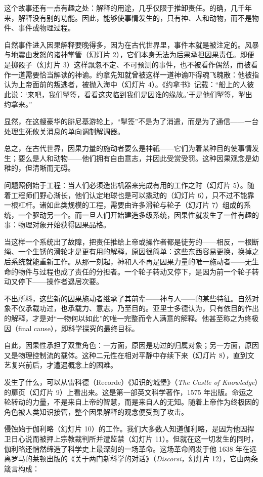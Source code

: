这个故事还有一点有趣之处：解释的用途，几乎仅限于推卸责任。的确，几千年来，解释没有别的功能。因此，能够使事情发生的，只有神、人和动物，而不是物件、事件或物理过程。

自然事件进入因果解释要晚得多，因为在古代世界里，事件本就是被注定的。风暴与地震由发怒的诸神掌管（幻灯片 2），它们本身无法为后果承担因果责任。即便是掷骰子（幻灯片 3）这样飘忽不定、不可预测的事件，也不被看作偶然，而被看作一道需要恰当解读的神谕。约拿先知就曾被这样一道神谕吓得魂飞魄散：他被指认为上帝面前的叛逃者，被抛入海中（幻灯片 4）。《约拿书》记载：“船上的人彼此说：‘来吧，我们掣签，看看这灾临到我们是因谁的缘故。’于是他们掣签，掣出约拿来。”

显然，在这艘豪华的腓尼基游轮上，“掣签”不是为了消遣，而是为了通信——一台处理生死攸关消息的单向调制解调器。

总之，在古代世界，因果力量的施动者要么是神祇——它们为着某种目的使事情发生；要么是人和动物——他们拥有自由意志，并因此受赏受罚。这种因果观念是幼稚的，但清晰而无碍。

问题照例始于工程：当人们必须造出机器来完成有用的工作之时（幻灯片 5）。随着工程师们野心渐长，他们认定地球也是可以撬动的（幻灯片 6），只不过不能靠一根杠杆。诸如此类规模的工程，需要由许多滑轮与轮子（幻灯片 7）组成的系统，一个驱动另一个。而一旦人们开始建造多级系统，因果性就发生了一件有趣的事：物理对象开始获得因果品格。

当这样一个系统出了故障，把责任推给上帝或操作者都是徒劳的——相反，一根断绳、一个生锈的滑轮才是更有用的解释，原因很简单：这些东西容易更换，换掉之后系统就能重新工作。从那一刻起，神和人不再是因果力量的唯一施动者——无生命的物件与过程也成了责任的分担者。一个轮子转动又停下，是因为前一个轮子转动又停下——操作者退居次要。

不出所料，这些新的因果施动者继承了其前辈——神与人——的某些特征。自然对象不仅承载功过，也承载力、意志，乃至目的。亚里士多德认为，只有依目的作出的解释，才是对“一物何以如此”的唯一完整而令人满意的解释。他甚至称之为终极因（final cause），即科学探究的最终目标。

自此，因果性承担了双重角色：一方面，原因是功过的归属对象；另一方面，原因又是物理控制流的载体。这种二元性在相对平静中存续下来（幻灯片 8），直到文艺复兴前后，才遭遇概念上的困难。

发生了什么，可以从雷科德（Recorde）《知识的城堡》（\textit{The Castle of Knowledge}）的扉页（幻灯片 9）上看出来。这是第一部英文科学著作，1575 年出版。命运之轮转动的力量，不是来自上帝的智慧，而是来自人的无知。随着上帝作为终极因的角色被人类知识接管，整个因果解释的观念便受到了攻击。

侵蚀始于伽利略（幻灯片 10）的工作。我们大多数人知道伽利略，是因为他因捍卫日心说而被押上宗教裁判所并遭监禁（幻灯片 11）。但就在这一切发生的同时，伽利略还悄然缔造了科学史上最深刻的一场革命。这场革命阐发于他 1638 年在远离罗马的莱顿出版的《关于两门新科学的对话》（\textit{Discorsi}，幻灯片 12），它由两条箴言构成：

